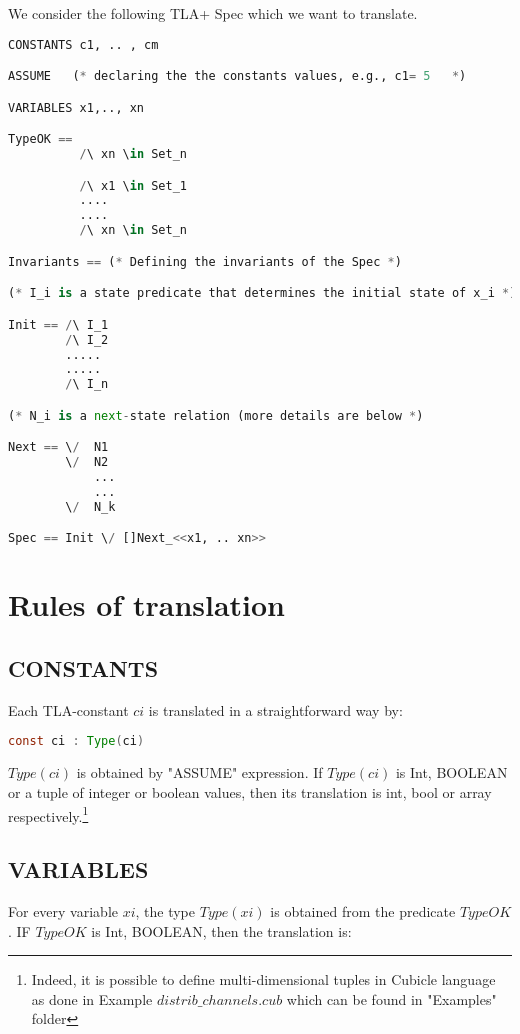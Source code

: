 \documentclass{article}
\theoremstyle{plain}
\numberwithin{equation}{section}
\begin{document}
\large


  

We consider the following TLA+ Spec which we want to translate.

\begin{lstlisting}[language=Python]
CONSTANTS c1, .. , cm

ASSUME   (* declaring the the constants values, e.g., c1= 5   *)  

VARIABLES x1,.., xn

TypeOK == 
          /\ xn \in Set_n

          /\ x1 \in Set_1
          ....
          ....
          /\ xn \in Set_n

Invariants == (* Defining the invariants of the Spec *)           

(* I_i is a state predicate that determines the initial state of x_i *)

Init == /\ I_1    
        /\ I_2 
        .....
        .....
        /\ I_n 

(* N_i is a next-state relation (more details are below *)

Next == \/  N1 
        \/  N2 
            ...
            ...
        \/  N_k 

Spec == Init \/ []Next_<<x1, .. xn>>        
\end{lstlisting}
 

\section*{Rules of translation}

 
\subsection*{CONSTANTS} Each TLA-constant $ci$ is  translated in a straightforward  way  by:  
   
\begin{lstlisting}[language=Java]
const ci : Type(ci) 
\end{lstlisting}

\emph{$Type(ci)$} is obtained by "ASSUME" expression. If \emph{$Type(ci)$} is Int, BOOLEAN or a tuple of integer or boolean values, then its translation is int,  bool or array respectively.\footnote{Indeed, it is possible to define multi-dimensional tuples in Cubicle language as done in Example \emph{$distrib\_channels.cub$} which can be found in "Examples" folder} 


\subsection*{VARIABLES} For every variable $xi$, the type  \emph{$Type(xi)$} is obtained from the predicate \emph{$TypeOK$}. IF \emph{$TypeOK$} is Int, BOOLEAN, then the translation is: 
\end{document}
